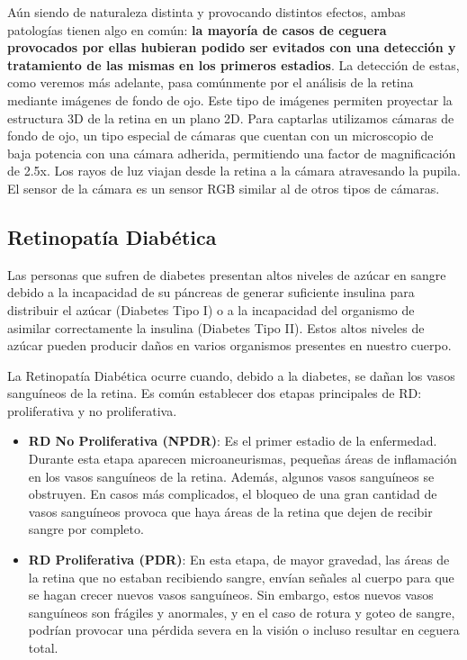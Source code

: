 \documentclass[
  12pt,
  spanish,
  a4paperpaper,
]{report}
\providecommand{\tightlist}{%
  \setlength{\itemsep}{0pt}\setlength{\parskip}{0pt}}
\begin{document}
Aún siendo de naturaleza distinta y provocando distintos efectos, ambas
patologías tienen algo en común: \textbf{la mayoría de casos de ceguera
provocados por ellas hubieran podido ser evitados con una detección y
tratamiento de las mismas en los primeros estadios}. La detección de
estas, como veremos más adelante, pasa comúnmente por el análisis de la
retina mediante imágenes de fondo de ojo. Este tipo de imágenes permiten
proyectar la estructura 3D de la retina en un plano 2D. Para captarlas
utilizamos cámaras de fondo de ojo, un tipo especial de cámaras que
cuentan con un microscopio de baja potencia con una cámara adherida,
permitiendo una factor de magnificación de 2.5x. Los rayos de luz viajan
desde la retina a la cámara atravesando la pupila. El sensor de la
cámara es un sensor RGB similar al de otros tipos de cámaras.

\hypertarget{retinopatuxeda-diabuxe9tica}{%
\subsection{Retinopatía Diabética}\label{retinopatuxeda-diabuxe9tica}}

Las personas que sufren de diabetes presentan altos niveles de azúcar en
sangre debido a la incapacidad de su páncreas de generar suficiente
insulina para distribuir el azúcar (Diabetes Tipo I) o a la incapacidad
del organismo de asimilar correctamente la insulina (Diabetes Tipo II).
Estos altos niveles de azúcar pueden producir daños en varios organismos
presentes en nuestro cuerpo.

La Retinopatía Diabética ocurre cuando, debido a la diabetes, se dañan
los vasos sanguíneos de la retina. Es común establecer dos etapas
principales de RD: proliferativa y no proliferativa.

\begin{itemize}
\tightlist
\item
  \textbf{RD No Proliferativa (NPDR)}: Es el primer estadio de la
  enfermedad. Durante esta etapa aparecen microaneurismas, pequeñas
  áreas de inflamación en los vasos sanguíneos de la retina. Además,
  algunos vasos sanguíneos se obstruyen. En casos más complicados, el
  bloqueo de una gran cantidad de vasos sanguíneos provoca que haya
  áreas de la retina que dejen de recibir sangre por completo.
\item
  \textbf{RD Proliferativa (PDR)}: En esta etapa, de mayor gravedad, las
  áreas de la retina que no estaban recibiendo sangre, envían señales al
  cuerpo para que se hagan crecer nuevos vasos sanguíneos. Sin embargo,
  estos nuevos vasos sanguíneos son frágiles y anormales, y en el caso
  de rotura y goteo de sangre, podrían provocar una pérdida severa en la
  visión o incluso resultar en ceguera total.
\end{itemize}
\end{document}
